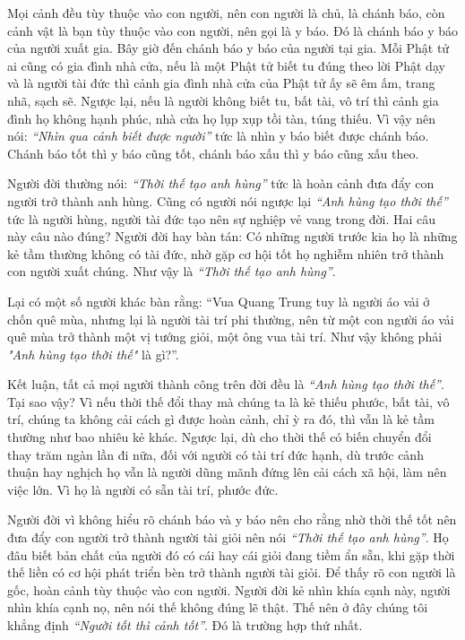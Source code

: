 \documentclass[
  12pt,
  oneside]{book}
\begin{document}
Mọi cảnh đều tùy thuộc vào con người, nên con người là chủ, là chánh báo, còn cảnh vật là bạn tùy thuộc vào con người, nên gọi là y báo. Đó là chánh báo y báo của người xuất gia. Bây giờ đến chánh báo y báo của người tại gia. Mỗi Phật tử ai cũng có gia đình nhà cửa, nếu là một Phật tử biết tu đúng theo lời Phật dạy và là người tài đức thì cảnh gia đình nhà cửa của Phật tử ấy sẽ êm ấm, trang nhã, sạch sẽ. Ngược lại, nếu là người không biết tu, bất tài, vô trí thì cảnh gia đình họ không hạnh phúc, nhà cửa họ lụp xụp tồi tàn, túng thiếu. Vì vậy nên nói: \emph{``Nhìn qua cảnh biết được người''} tức là nhìn y báo biết được chánh báo. Chánh báo tốt thì y báo cũng tốt, chánh báo xấu thì y báo cũng xấu theo.

Người đời thường nói: \emph{``Thời thế tạo anh hùng''} tức là hoàn cảnh đưa đẩy con người trở thành anh hùng. Cũng có người nói ngược lại \emph{``Anh hùng tạo thời thế''} tức là người hùng, người tài đức tạo nên sự nghiệp vẻ vang trong đời. Hai câu này câu nào đúng? Người đời hay bàn tán: Có những người trước kia họ là những kẻ tầm thường không có tài đức, nhờ gặp cơ hội tốt họ nghiễm nhiên trở thành con người xuất chúng. Như vậy là \emph{``Thời thế tạo anh hùng''}.

Lại có một số người khác bàn rằng: ``Vua Quang Trung tuy là người áo vải ở chốn quê mùa, nhưng lại là người tài trí phi thường, nên từ một con người áo vải quê mùa trở thành một vị tướng giỏi, một ông vua tài trí. Như vậy không phải \emph{"Anh hùng tạo thời thế"} là gì?''.

Kết luận, tất cả mọi người thành công trên đời đều là \emph{``Anh hùng tạo thời thế''}. Tại sao vậy? Vì nếu thời thế đổi thay mà chúng ta là kẻ thiếu phước, bất tài, vô trí, chúng ta không cải cách gì được hoàn cảnh, chỉ ỳ ra đó, thì vẫn là kẻ tầm thường như bao nhiêu kẻ khác. Ngược lại, dù cho thời thế có biến chuyển đổi thay trăm ngàn lần đi nữa, đối với người có tài trí đức hạnh, dù trước cảnh thuận hay nghịch họ vẫn là người dũng mãnh đứng lên cải cách xã hội, làm nên việc lớn. Vì họ là người có sẵn tài trí, phước đức.

Người đời vì không hiểu rõ chánh báo và y báo nên cho rằng nhờ thời thế tốt nên đưa đẩy con người trở thành người tài giỏi nên nói \emph{``Thời thế tạo anh hùng''}. Họ đâu biết bản chất của người đó có cái hay cái giỏi đang tiềm ẩn sẵn, khi gặp thời thế liền có cơ hội phát triển bèn trở thành người tài giỏi. Để thấy rõ con người là gốc, hoàn cảnh tùy thuộc vào con người. Người đời kẻ nhìn khía cạnh này, người nhìn khía cạnh nọ, nên nói thế không đúng lẽ thật. Thế nên ở đây chúng tôi khẳng định \emph{``Người tốt thì cảnh tốt''}. Đó là trường hợp thứ nhất.
\end{document}
